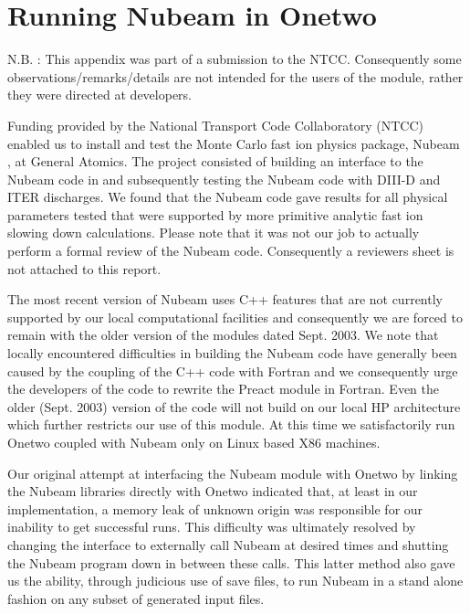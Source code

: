 



\section{Running  Nubeam in Onetwo} \label{intro}

 N.B. : This appendix was part of a submission to the NTCC.
 Consequently some observations/remarks/details are not intended for
 the users of the module, rather they were  directed at developers.


 Funding provided by the National Transport Code Collaboratory 
(NTCC) enabled us to install and test  the Monte Carlo fast ion 
 physics package, Nubeam \cite{ref1}, at General Atomics. The project consisted
 of building an interface to the Nubeam  code in \ot and subsequently
 testing the Nubeam  code with DIII-D and ITER discharges. We found
 that the Nubeam code gave results for all physical parameters tested
 that were supported by more primitive analytic fast ion slowing down
 calculations. Please note
 that it was not our job to actually perform a formal review of the
 Nubeam code. Consequently a reviewers sheet is not attached to this
 report. 

  The most recent version of Nubeam uses C++ features that are not
  currently supported by our local computational facilities and 
  consequently we  are forced to remain with the older version of
  the modules dated Sept. 2003. We note that locally encountered 
  difficulties in building the Nubeam code have generally been caused
  by the coupling of the C++ code with Fortran and we consequently urge the
  developers of the  code to rewrite the Preact module in Fortran.
  Even the older (Sept. 2003)  version of the code will not build on
  our local HP architecture which further restricts our use of this
  module. At this time we satisfactorily run Onetwo coupled with
  Nubeam only on Linux based X86 machines. 

   Our original attempt at interfacing the Nubeam module with Onetwo 
   by linking  the Nubeam libraries directly with Onetwo indicated
   that, at least in our implementation, a memory leak of unknown origin
   was responsible for our inability to get successful runs. This
   difficulty was ultimately resolved by changing the interface to
   externally call Nubeam at desired times and shutting the Nubeam
   program down in between these calls. This latter method also gave
   us the ability, through judicious use of save files, to run Nubeam
   in a stand alone fashion on any subset of \ot generated input
   files.  

